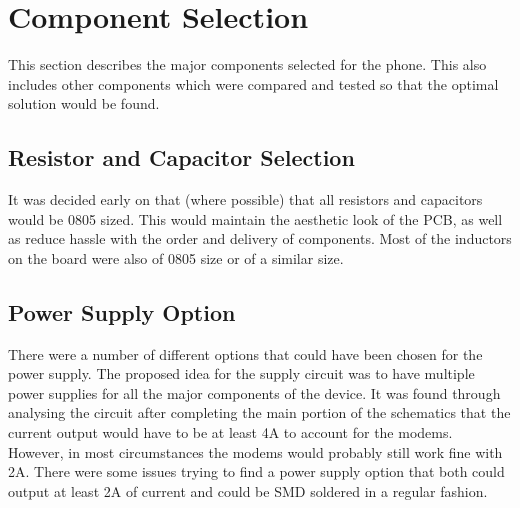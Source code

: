 
\section{Component Selection} 
	
	This section describes the major components selected for the phone. This also includes other components which were compared and tested so that the optimal solution would be found. 


\subsection{Resistor and Capacitor Selection}

It was decided early on that (where possible) that all resistors and capacitors would be 0805 sized. This would maintain the aesthetic look of the PCB, as well as reduce hassle with the order and delivery of components. Most of the inductors on the board were also of 0805 size or of a similar size. 


\subsection{Power Supply Option}

	There were a number of different options that could have been chosen for the power supply. The proposed idea for the supply circuit was to have multiple power supplies for all the major components of the device. It was found through analysing the circuit after completing the main portion of the schematics that the current output would have to be at least 4A to account for the modems. However, in most circumstances the modems would probably still work fine with 2A. There were some issues trying to find a power supply option that both could output at least 2A of current and could be SMD soldered in a regular fashion. 

